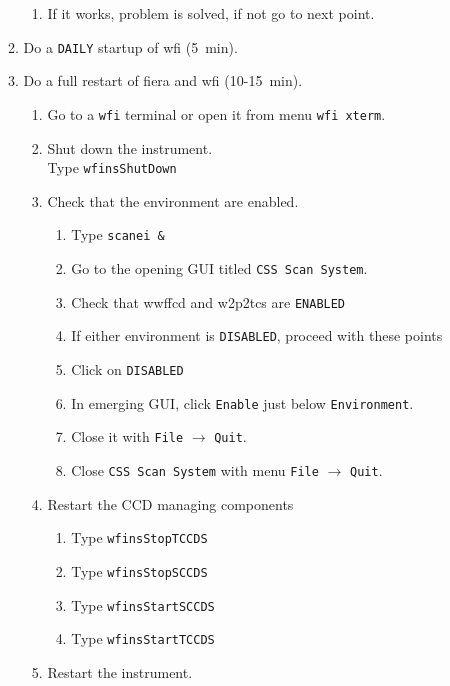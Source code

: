 \documentclass[11pt,fleqn]{book}
\begin{document}
\begin{enumerate}
\begin{enumerate}
\begin{enumerate}
           \item If it works, problem is solved, if not go to next point.
        \end{enumerate}
      \item Do a \texttt{DAILY} startup of \gls{wfi} (5~min).
      \item\label{list:wfifierarestart} Do a full restart of \gls{fiera} and \gls{wfi} (10-15~min).
        \begin{enumerate}
          \item Go to a \texttt{wfi} terminal or open it from menu \texttt{wfi xterm}.
          \item Shut down the instrument.\\
                Type \texttt{wfinsShutDown}
          \item Check that the environment are enabled.
             \begin{enumerate}
               \item Type \texttt{scanei \&} 
               \item Go to the opening GUI titled \texttt{CSS Scan System}.
               \item Check that \gls{wwffcd} and \gls{w2p2tcs} are \texttt{ENABLED}
               \item If either environment is \texttt{DISABLED}, proceed with these points
               \item Click on \texttt{DISABLED}
               \item In emerging GUI, click \texttt{Enable} just below \texttt{Environment}.
               \item Close it with \texttt{File} $\rightarrow$ \texttt{Quit}.
               \item Close \texttt{CSS Scan System} with menu \texttt{File} $\rightarrow$ \texttt{Quit}.
            \end{enumerate} 
          \item Restart the CCD managing components
             \begin{enumerate} 
               \item Type \texttt{wfinsStopTCCDS}
               \item Type \texttt{wfinsStopSCCDS}
               \item Type \texttt{wfinsStartSCCDS}
               \item Type \texttt{wfinsStartTCCDS}
             \end{enumerate}
          \item Restart the instrument.\\

\end{enumerate}
\end{enumerate}
\end{enumerate}
\end{document}
